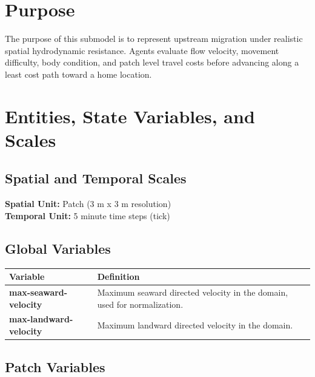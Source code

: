 \documentclass[
]{book}
\begin{document}
\section{Purpose}\label{purpose-6}

The purpose of this submodel is to represent upstream migration under realistic spatial hydrodynamic resistance. Agents evaluate flow velocity, movement difficulty, body condition, and patch level travel costs before advancing along a least cost path toward a home location.

\section{Entities, State Variables, and Scales}\label{entities-state-variables-and-scales-7}

\subsection{Spatial and Temporal Scales}\label{spatial-and-temporal-scales-7}

\textbf{Spatial Unit:} Patch (3 m x 3 m resolution)\\
\textbf{Temporal Unit:} 5 minute time steps (tick)

\subsection{Global Variables}\label{global-variables-7}

\begin{longtable}[]{@{}
  >{\centering\arraybackslash}p{}
  >{\centering\arraybackslash}p{}@{}}
\toprule\noalign{}
\begin{minipage}[b]{\linewidth}\centering
Variable
\end{minipage} & \begin{minipage}[b]{\linewidth}\centering
Definition
\end{minipage} \\
\midrule\noalign{}
\endhead
\bottomrule\noalign{}
\endlastfoot
\textbf{max-seaward-velocity} & Maximum seaward directed velocity in the domain, used for normalization. \\
\textbf{max-landward-velocity} & Maximum landward directed velocity in the domain. \\
\end{longtable}

\subsection{Patch Variables}\label{patch-variables-7}
\end{document}
